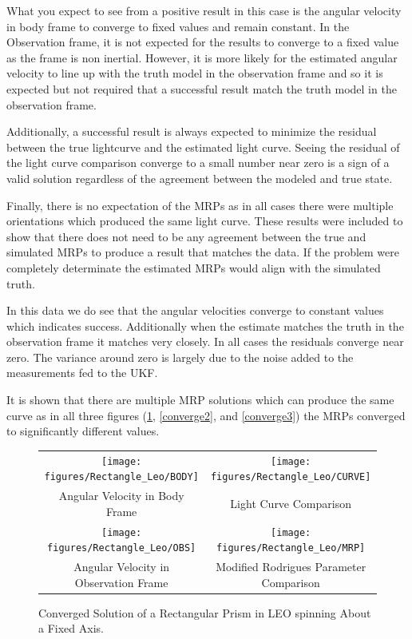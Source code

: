 What you expect to see from a positive result in this case is the angular velocity in body frame to converge to fixed values and remain constant. In the Observation frame, it is not expected for the results to converge to a fixed value as the frame is non inertial. However, it is more likely for the estimated angular velocity to line up with the truth model in the observation frame and so it is expected but not required that a successful result match the truth model in the observation frame.

Additionally, a successful result is always expected to minimize the residual between the true lightcurve and the estimated light curve. Seeing the residual of the light curve comparison converge to a small number near zero is a sign of a valid solution regardless of the agreement between the modeled and true state.

Finally, there is no expectation of the MRPs as in all cases there were multiple orientations which produced the same light curve. These results were included to show that there does not need to be any agreement between the true and simulated MRPs to produce a result that matches the data. If the problem were completely determinate the estimated MRPs would align with the simulated truth.

In this data we do see that the angular velocities converge to constant values which indicates success. Additionally when the estimate matches the truth in the observation frame it matches very closely. In all cases the residuals converge near zero. The variance around zero is largely due to the noise added to the measurements fed to the UKF.

It is shown that there are multiple MRP solutions which can produce the same curve as in all three figures (\ref{converge1}, \ref{converge2}, and \ref{converge3}) the MRPs converged to significantly different values.

\begin{figure}[H]
	\begin{tabular}{cc}
		\texttt{[image: figures/Rectangle\_Leo/BODY]} &
		\texttt{[image: figures/Rectangle\_Leo/CURVE]} \\
		Angular Velocity in Body Frame & Light Curve Comparison \\
		\texttt{[image: figures/Rectangle\_Leo/OBS]} &
		\texttt{[image: figures/Rectangle\_Leo/MRP]} \\
		Angular Velocity in Observation Frame & Modified Rodrigues Parameter Comparison
	\end{tabular}
	\caption{Converged Solution of a Rectangular Prism in LEO spinning About a Fixed Axis.}
	\label{converge1}
\end{figure}


